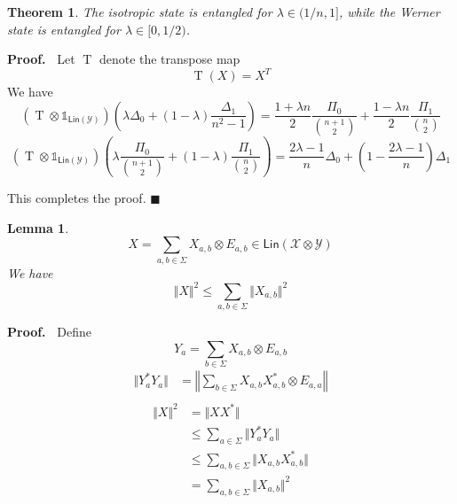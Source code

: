 \documentclass[aps,pra,onecolumn,notitlepage,superscriptaddress]{revtex4-1}
\newcommand{\spc}[1]{\mathcal{#1}}
\newcommand{\Lin}{\mathsf{Lin}}
\newcommand{\op}[1]{\operatorname{#1}}
\newcommand\I{\mathds{1}}
\newtheorem{theo}{Theorem}
\newtheorem{lemma}{Lemma}
\def\Proof{{\bf Proof.~}}
\def\qed{$\blacksquare$ \newline}
\begin{document}
    \begin{theo}
        The isotropic state is entangled for $\lambda \in (1/n,1]$, while the Werner state is entangled for $\lambda \in [0,1/2)$.
    \end{theo}
    \Proof
    Let $\op T$ denote the transpose map
        \begin{equation}
            \op T(X) = X^T
        \end{equation}
        We have
        \begin{equation}
            (\op T \otimes \I_{\Lin(\spc Y)}) \left(
                \lambda \Delta_0 + (1-\lambda) \frac{\Delta_1}{n^2-1}
            \right) = 
                \frac{1+\lambda n}{2} \frac{\Pi_0}{\binom{n+1}{2}} +
                \frac{1-\lambda n}{2} \frac{\Pi_1}{\binom{n}{2}}
        \end{equation}
        \begin{equation}
            (\op T \otimes \I_{\Lin(\spc Y)}) \left(
                \lambda \frac{\Pi_0}{\binom{n+1}{2}} + (1-\lambda) \frac{\Pi_1}{\binom{n}{2}}
            \right) = 
                \frac{2\lambda - 1}{n} \Delta_0 +
                \left( 1- \frac{2\lambda - 1}{n} \right) \Delta_1
        \end{equation}
        
        This completes the proof. \qed

    \begin{lemma}
        \begin{equation}
            X = \sum_{a,b \in \Sigma} X_{a,b} \otimes E_{a,b} \in \Lin(\spc X \otimes \spc Y)
        \end{equation}
        We have
        \begin{equation}
            \Vert X \Vert^2 \leq \sum_{a,b \in \Sigma} \Vert X_{a,b} \Vert^2
        \end{equation}
    \end{lemma}
    \Proof
    Define
    \begin{equation}
        Y_a = \sum_{b \in \Sigma} X_{a,b} \otimes E_{a,b}
    \end{equation}
    \begin{align*}
        \Vert Y_a^*Y_a \Vert
        &= \left\Vert \sum_{b \in \Sigma} X_{a,b}X_{a,b}^* \otimes E_{a,a} \right\Vert \\
    \end{align*}
    \begin{align*}
        \Vert X \Vert^2
        &= \Vert XX^* \Vert \\
        &\leq \sum_{a \in \Sigma} \Vert Y_a^*Y_a \Vert \\
        &\leq \sum_{a,b \in \Sigma} \Vert X_{a,b}X_{a,b}^* \Vert \\
        &= \sum_{a,b \in \Sigma} \Vert X_{a,b} \Vert^2
    \end{align*}
\end{document}
